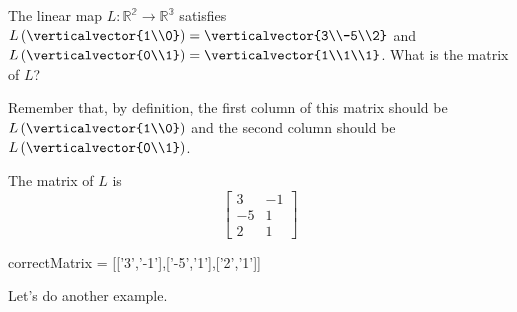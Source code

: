 \documentclass{ximera}
\begin{document}
\begin{question}
  The linear map $L:\mathbb{R^2}\to\mathbb{R^3}$ satisfies
  $L\left(\verticalvector{1\\0}\right) = \verticalvector{3\\-5\\2}$ and
  $L\left(\verticalvector{0\\1}\right) = \verticalvector{1\\1\\1}$.  What is the
  matrix of $L$?

  \begin{solution}
  	\begin{hint}
  		Remember that, by definition, the first column of this matrix should be $L\left(\verticalvector{1\\0}\right)$ and
  		the second column should be $L\left( \verticalvector{0\\1}\right)$.
  	\end{hint}
  	\begin{hint}
  		The matrix of $L$ is 
  		\[
  			\begin{bmatrix}
  				3&-1\\
  				-5&1\\
  				2&1
  			\end{bmatrix}
  			\]
  	\end{hint}
    \begin{matrix-answer}[name=L]
      correctMatrix = [['3','-1'],['-5','1'],['2','1']]
    \end{matrix-answer}    
  \end{solution}
\end{question}

Let's do another example.
\end{document}
